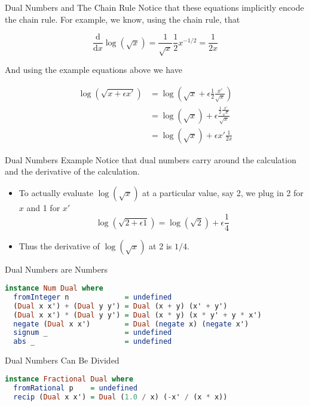 \documentclass{beamer}
\begin{document}
\begin{frame}[fragile]{Dual Numbers and The Chain Rule}
Notice that these equations implicitly encode the chain rule. For
example, we know, using the chain rule, that

$$
\frac{\mathrm{d}}{\mathrm{d} x}\log(\sqrt x) =
\frac{1}{\sqrt x}\frac{1}{2}x^{-1/2} =
\frac{1}{2x}
$$

And using the example equations above we have

$$
\begin{aligned}
\log(\sqrt {x + \epsilon x'}) &= \log (\sqrt{x} + \epsilon\frac{1}{2}\frac{x'}{\sqrt{x}}) \\
                              &= \log (\sqrt{x}) + \epsilon\frac{\frac{1}{2}\frac{x'}{\sqrt{x}}}{\sqrt{x}} \\
                              &= \log (\sqrt{x}) + \epsilon x'\frac{1}{2x}
\end{aligned}
$$
\end{frame}

\begin{frame}[fragile]{Dual Numbers Example}
Notice that dual numbers carry around the calculation and the
derivative of the calculation.

\begin{itemize}
\item
To actually evaluate $\log(\sqrt{x})$
at a particular value, say 2, we plug in 2 for $x$ and 1 for $x'$
$$
\log (\sqrt{2 + \epsilon 1}) = \log(\sqrt{2}) + \epsilon\frac{1}{4}
$$
\item
Thus the derivative of $\log(\sqrt{x})$ at 2 is $1/4$.
\end{itemize}
\end{frame}

\begin{frame}[fragile]{Dual Numbers are Numbers}
\begin{scriptsize}
\begin{lstlisting}[language=Haskell]
instance Num Dual where
  fromInteger n             = undefined
  (Dual x x') + (Dual y y') = Dual (x + y) (x' + y')
  (Dual x x') * (Dual y y') = Dual (x * y) (x * y' + y * x')
  negate (Dual x x')        = Dual (negate x) (negate x')
  signum _                  = undefined
  abs _                     = undefined
\end{lstlisting}
\end{scriptsize}
\end{frame}

\begin{frame}[fragile]{Dual Numbers Can Be Divided}
\begin{scriptsize}
\begin{lstlisting}[language=Haskell]
instance Fractional Dual where
  fromRational p    = undefined
  recip (Dual x x') = Dual (1.0 / x) (-x' / (x * x))
\end{lstlisting}
\end{scriptsize}
\end{frame}
\end{document}
